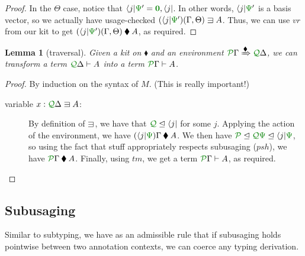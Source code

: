 \documentclass[submission,copyright,creativecommons]{eptcs}
\newtheorem{lemma}[theorem]{Lemma}
\newcommand{\kitrel}{\mathbin{\blacklozenge}}
\begin{document}
\begin{proof}
  In the $\Theta$ case, notice that
  $\langle j \rvert\rescomment\Psi' = \rescomment{\vct 0}, \langle j \rvert$.
  In other words, $\langle j \rvert\rescomment\Psi'$ is a basis vector, so we
  actually have usage-checked
  $(\langle j \rvert\rescomment\Psi')(\Gamma, \Theta) \lvar A$.
  Thus, we can use $\mathit{vr}$ from our kit to get
  $(\langle j \rvert\rescomment\Psi')(\Gamma, \Theta) \kitrel A$, as required.
\end{proof}

\begin{lemma}[traversal]\label{lem:trav}
  Given a kit on $\kitrel$ and an environment
  $\ctx{\Gamma}{P} \subst{\kitrel} \ctx{\Delta}{Q}$, we can transform a term
  $\ctx{\Delta}{Q} \vdash A$ into a term $\ctx{\Gamma}{P} \vdash A$.
\end{lemma}
\begin{proof}
  By induction on the syntax of $M$. (This is really important!)
  \begin{description}
    \item[variable $x : \ctx{\Delta}{Q} \lvar A$:]
      By definition of $\lvar$, we have that
      $\resctx Q \subres \langle j \rvert$ for some $j$.
      Applying the action of the environment, we have
      $(\langle j \rvert\rescomment\Psi)\Gamma \kitrel A$.
      We then have
      $\resctx P \subres \resctx Q\rescomment\Psi \subres \langle j \rvert\rescomment\Psi$,
      so using the fact that stuff appropriately respects subusaging
      ($\mathit{psh}$), we have $\ctx{\Gamma}{P} \kitrel A$.
      Finally, using $\mathit{tm}$, we get a term $\ctx{\Gamma}{P} \vdash A$, as
      required.
  \end{description}
\end{proof}

\subsection{Subusaging}

Similar to subtyping, we have as an admissible rule that if subusaging holds
pointwise between two annotation contexts, we can coerce any typing derivation.
\end{document}
